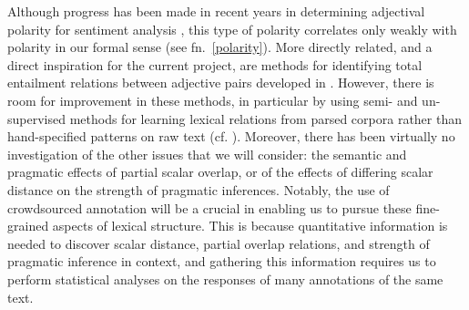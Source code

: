 \documentclass[10pt]{article}
\begin{document}
Although progress has been made in recent years in determining adjectival polarity for sentiment analysis \cite{williams2009predicting}, this type of polarity correlates only weakly with polarity in our formal sense (see fn.\ \ref{polarity}). More directly related, and a direct inspiration for the current project, are methods for identifying total entailment relations between adjective pairs developed in \cite{sheinman2009adjscales,sheinmanetal2013}. However, there is room for improvement in these methods, in particular by using semi- and un-supervised methods for learning lexical relations from parsed corpora rather than hand-specified patterns on raw text (cf. \cite{snow04,davidov2008unsupervised,turney2008uniform}). Moreover, there has been virtually no investigation of the other issues that we will consider: the semantic and pragmatic effects of partial scalar overlap, or of the effects of differing scalar distance on the strength of pragmatic inferences. Notably, the use of crowdsourced annotation will be a crucial in enabling us to pursue these fine-grained aspects of lexical structure. This is because quantitative information is needed to discover scalar distance, partial overlap relations, and strength of pragmatic inference in context, and gathering this information requires us to perform statistical analyses on the responses of many annotations of the same text. 
\end{document}
